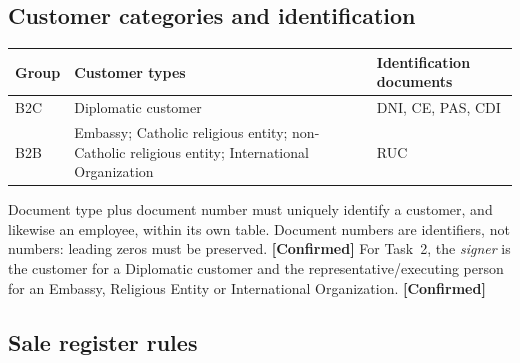 \documentclass[11pt,a4paper]{article}
\newcommand{\tagconf}{\textcolor{green!45!black}{\textbf{[Confirmed]}}}
\begin{document}
\subsection{Customer categories and identification}

\begin{longtable}{@{}L{2.4cm}L{7.0cm}L{6.4cm}@{}}
	\toprule
	\textbf{Group}                     & \textbf{Customer types}
	                                   & \textbf{Identification documents}
	\\
	\midrule
	\endhead
	B2C                                & Diplomatic customer
	                                   & DNI, CE, PAS, CDI
	\\
	B2B                                & Embassy; Catholic religious entity;
	non-Catholic religious
	entity; International Organization & RUC                                 \\
	\bottomrule
\end{longtable}

Document type plus document number must uniquely identify a customer, and
likewise an employee, within its own table. Document numbers are identifiers,
not numbers: leading zeros must be preserved. \tagconf{} For Task~2, the
\emph{signer} is the customer for a Diplomatic customer and the
representative/executing person for an Embassy, Religious Entity or
International Organization. \tagconf{}

\subsection{Sale register rules}
\end{document}
